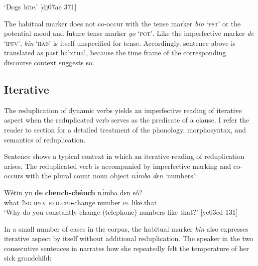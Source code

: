 \glt ‘Dogs bite.’ [dj07ae 371]
\z

The habitual marker does not co-occur with the tense marker \textit{bin} ‘\textsc{pst’} or the potential mood and future tense marker \textit{go} ‘\textsc{pot’}. Like the imperfective marker \textit{de} ‘\textsc{ipfv}’, \textit{kin} ‘\textsc{hab}’ is itself unspecified for tense. Accordingly, sentence  above is translated as past habitual, because the time frame of the corresponding discourse context suggests so. 

\subsection{Iterative}\label{sec:6.3.6}

The reduplication of dynamic verbs yields an imperfective reading of iterative aspect when the reduplicated verb serves as the predicate of a clause. I refer the reader to section  for a detailed treatment of the phonology, morphosyntax, and semantics of reduplication.


Sentence  shows a typical context in which an iterative reading of reduplication arises. The reduplicated verb is accompanied by imperfective marking and co-occurs with the plural count noun object \textit{nɔ́mba dɛn} ‘numbers’:



\ea%
    \label{ex:key:347}
    \gll Wétin  yu  \textbf{de}  \textbf{chench-chénch}  nɔ́mba  dɛn  só?\\
what  \textsc{2sg}  \textsc{ipfv}  \textsc{red.cpd-}change  number  \textsc{pl}  like.that\\

\glt ‘Why do you constantly change (telephone) numbers like that?’ [ye03cd 131]
\z

In a small number of cases in the corpus, the habitual marker \textit{kin} also expresses iterative aspect by itself without additional reduplication. The speaker in the two consecutive sentences in  narrates how she repeatedly felt the temperature of her sick grandchild: 


\ea%
    \label{ex:key:348}
\z
\z

